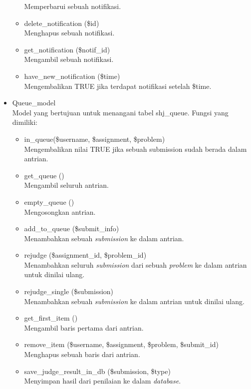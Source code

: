 \begin{itemize}
\begin{itemize}
 Memperbarui sebuah notifikasi.
        \item delete\_notification (\$id)\\
 Menghapus sebuah notifikasi.
        \item get\_notification (\$notif\_id)\\
 Mengambil sebuah notifikasi.
        \item have\_new\_notification (\$time)\\
 Mengembalikan TRUE jika terdapat notifikasi setelah \$time.
    \end{itemize}
        \item Queue\_model \\
 Model yang bertujuan untuk menangani tabel shj\_queue. Fungsi yang dimiliki:
        \begin{itemize}
            \item in\_queue(\$username, \$assignment, \$problem)\\
 Mengembalikan nilai TRUE jika sebuah submission sudah berada dalam antrian.
            \item get\_queue ()\\
 Mengambil seluruh antrian.
            \item empty\_queue ()\\
 Mengosongkan antrian.
            \item add\_to\_queue (\$submit\_info)\\
 Menambahkan sebuah \textit{submission} ke dalam antrian.
            \item rejudge (\$assignment\_id, \$problem\_id) \\
 Menambahkan seluruh \textit{submission} dari sebuah \textit{problem} ke dalam antrian untuk dinilai ulang.
            \item rejudge\_single (\$submission) \\
 Menambahkan sebuah \textit{submission} ke dalam antrian untuk dinilai ulang.
            \item get\_first\_item ()\\
 Mengambil baris pertama dari antrian.
            \item remove\_item (\$username, 
            \$assignment, \$problem, \$submit\_id)
 Menghapus sebuah baris dari antrian.
            \item save\_judge\_result\_in\_db (\$submission, \$type)\\
 Menyimpan hasil dari penilaian ke dalam \textit{database}.
        \end{itemize}

\end{itemize}
